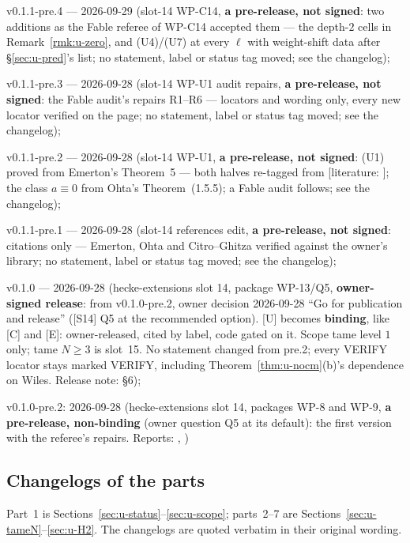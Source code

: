 \documentclass[11pt]{article}
\newcommand{\LIT}[1]{\textsf{[literature: #1]}}   %
\begin{document}
v0.1.1-pre.4 --- 2026-09-29 (slot-14 WP-C14, \textbf{a pre-release, not signed}: two \COMP{} additions as the Fable referee of
WP-C14 accepted them --- the depth-$2$ cells in Remark~\ref{rmk:u-zero}, and (U4)/(U7) at every $\ell$ with weight-shift data after \S\ref{sec:u-pred}'s list;
no statement, label or status tag moved; see the changelog);

v0.1.1-pre.3 --- 2026-09-28 (slot-14 WP-U1 audit repairs, \textbf{a pre-release, not signed}: the Fable audit's repairs R1--R6 ---
locators and wording only, every new locator verified on the page; no statement, label or status tag moved; see the changelog);

v0.1.1-pre.2 --- 2026-09-28 (slot-14 WP-U1, \textbf{a pre-release, not signed}: (U1) proved from Emerton's Theorem~5 --- both halves re-tagged
\PROVED{} from \LIT{}; the class $a\equiv0$ from Ohta's Theorem~(1.5.5); a Fable audit follows; see the changelog);

v0.1.1-pre.1 --- 2026-09-28 (slot-14 references edit, \textbf{a pre-release, not signed}: citations only ---
Emerton, Ohta and Citro--Ghitza verified against the owner's library; no statement, label or status tag moved; see the changelog);

v0.1.0 --- 2026-09-28 (hecke-extensions slot 14, package WP-13/Q5, \textbf{owner-signed
release}: from v0.1.0-pre.2, owner decision 2026-09-28 ``Go for publication and release'' ([S14] Q5 at the
recommended option). [U] becomes \textbf{binding}, like [C] and [E]: owner-released, cited by label, code
gated on it. Scope tame level $1$ only; tame $N\ge3$ is slot~15. No statement changed from pre.2; every
VERIFY locator stays marked VERIFY, including Theorem~\ref{thm:u-nocm}(b)'s dependence on Wiles. Release
note:  \S6);

v0.1.0-pre.2: 2026-09-28 (hecke-extensions slot 14, packages WP-8 and WP-9, \textbf{a pre-release,
non-binding} (owner question Q5 at its default): the first version with the referee's repairs. Reports:
, )

\subsection{Changelogs of the parts}
Part~1 is Sections~\ref{sec:u-status}--\ref{sec:u-scope}; parts~2--7 are Sections~\ref{sec:u-tameN}--\ref{sec:u-H2}. The changelogs are quoted verbatim in their original wording.
\end{document}
